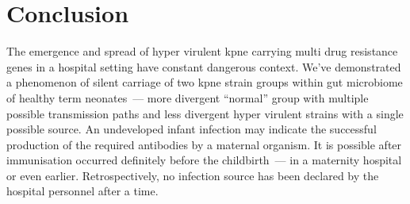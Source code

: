 \section{Conclusion}\label{sec:conclusion}

The emergence and spread of hyper virulent \gls{kpne} carrying multi drug resistance genes in a hospital setting
have constant dangerous context.
We've demonstrated a phenomenon of silent carriage of two \gls{kpne} strain groups within gut microbiome
of healthy term neonates~--- more divergent ``normal'' group with multiple possible transmission paths and
less divergent hyper virulent strains with a single possible source.
An undeveloped infant infection may indicate the successful production of the required antibodies by a maternal
organism.
It is possible after immunisation occurred definitely before the childbirth~--- in a maternity hospital or even earlier.
Retrospectively, no infection source has been declared by the hospital personnel after a time.
